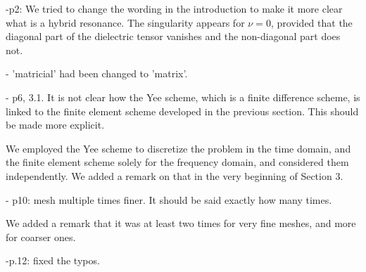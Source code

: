 \documentclass[a4paper,10pt]{article}
\begin{document}
-p2:  We tried to change the wording in the introduction to make it more clear what is a hybrid resonance. 
The singularity appears for $\nu=0$, provided that the diagonal part of the dielectric tensor vanishes and the non-diagonal part does not. 

- 'matricial' had been changed to 'matrix'.

- p6, 3.1. It is not clear how the Yee scheme, which is a finite difference scheme, is linked to the
finite element scheme developed in the previous section. This should be made more explicit.

We employed the Yee scheme to discretize the problem in the time domain, and the finite element scheme solely for the frequency domain, 
and considered them independently. We added a remark on that in the very beginning of Section 3. 

- p10: mesh multiple times finer. It should be said exactly how many times. 

We added a remark that it was at least two times for very fine meshes, and more for coarser ones.

-p.12: fixed the typos.


  
 
\end{document}
